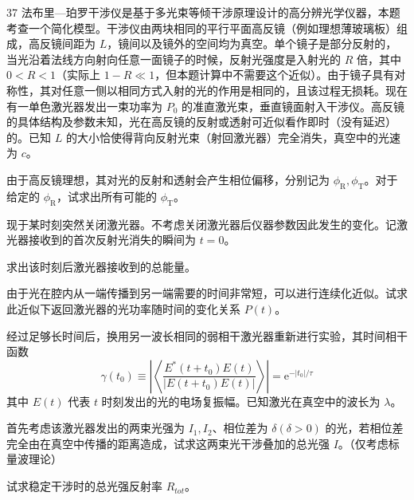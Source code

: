 
\begin{problem}{37}
    法布里—珀罗干涉仪是基于多光束等倾干涉原理设计的高分辨光学仪器，本题考查一个简化模型。干涉仪由两块相同的平行平面高反镜（例如理想薄玻璃板）组成，高反镜间距为 $L$，镜间以及镜外的空间均为真空。单个镜子是部分反射的，当光沿着法线方向射向任意一面镜子的时候，反射光强度是入射光的 $R$ 倍，其中 $0 < R < 1$（实际上 $1 - R \ll 1$，但本题计算中不需要这个近似）。由于镜子具有对称性，其对任意一侧以相同方式入射的光的作用是相同的，且该过程无损耗。现在有一单色激光器发出一束功率为 $P_0$ 的准直激光束，垂直镜面射入干涉仪。高反镜的具体结构及参数未知，光在高反镜的反射或透射可近似看作即时（没有延迟）的。已知 $L$ 的大小恰使得背向反射光束（射回激光器）完全消失，真空中的光速为 $c$。
    \begin{subproblem}
        由于高反镜理想，其对光的反射和透射会产生相位偏移，分别记为 $\phi_{\mathrm{R}},\phi_{\mathrm{T}}$。对于给定的 $\phi_{\mathrm{R}}$，试求出所有可能的 $\phi_{\mathrm{T}}$。
    \end{subproblem}
    \begin{subproblem}
        现于某时刻突然关闭激光器。不考虑关闭激光器后仪器参数因此发生的变化。记激光器接收到的首次反射光消失的瞬间为 $t = 0$。
        \begin{subsubproblem}
            求出该时刻后激光器接收到的总能量。
        \end{subsubproblem}
        \begin{subsubproblem}
            由于光在腔内从一端传播到另一端需要的时间非常短，可以进行连续化近似。试求此近似下返回激光器的光功率随时间的变化关系 $P(t)$。
        \end{subsubproblem}
    \end{subproblem}
    \begin{subproblem}
        经过足够长时间后，换用另一波长相同的弱相干激光器重新进行实验，其时间相干函数
        \begin{equation}
            \gamma (t _ {0}) \equiv \left| \left\langle \frac {E ^ {*} (t + t _ {0}) E (t)}{| E (t + t _ {0}) E (t) |} \right\rangle \right| = \mathrm{e} ^ {- | t _ {0} | / \tau}
        \end{equation}
        其中 $E(t)$ 代表 $t$ 时刻发出的光的电场复振幅。已知激光在真空中的波长为 $\lambda$。
        \begin{subsubproblem}
            首先考虑该激光器发出的两束光强为 $I_{1}, I_{2}$、相位差为 $\delta (\delta > 0)$ 的光，若相位差完全由在真空中传播的距离造成，试求这两束光干涉叠加的总光强 $I$。（仅考虑标量波理论）
        \end{subsubproblem}
        \begin{subsubproblem}
            试求稳定干涉时的总光强反射率 $R_{tot}$。
        \end{subsubproblem}
    \end{subproblem}
\end{problem}

